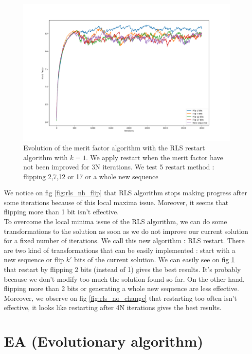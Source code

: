 \documentclass[a4paper,11pt,openany]{article}
\begin{document}
\begin{figure}[H]
\begin{center}
\includegraphics[scale=0.25]{Images/rls_restart}
\caption{Evolution of the merit factor algorithm with the RLS restart algorithm with $k=1$. We apply restart when the merit factor have not been improved for 3N iterations. We test 5 restart method : flipping 2,7,12 or 17 or a whole new sequence}
\label{fig:rls_restart}
\end{center}
\end{figure}
\noindent
We notice on fig \ref{fig:rls_nb_flip} that RLS algorithm stops making progress after some iterations because of this local maxima issue. Moreover, it seems that flipping more than 1 bit isn't effective.\\
To overcome the local minima issue of the RLS algorithm, we can do some transformations to the solution as soon as we do not improve our current solution for a fixed number of iterations. We call this new algorithm : RLS restart. There are two kind of transformations that can be easily implemented : start with a new sequence or flip $k'$ bits of the current solution. We can easily see on fig \ref{fig:rls_restart} that restart by flipping 2 bits (instead of 1) gives the best results. It's probably because we don't modify too much the solution found so far. On the other hand, flipping more than 2 bits or generating a whole new sequence are less effective. Moreover, we observe on fig \ref{fig:rls_no_change} that restarting too often isn't effective, it looks like restarting after 4N iterations gives the best results.
\section{EA (Evolutionary algorithm)}
\end{document}

